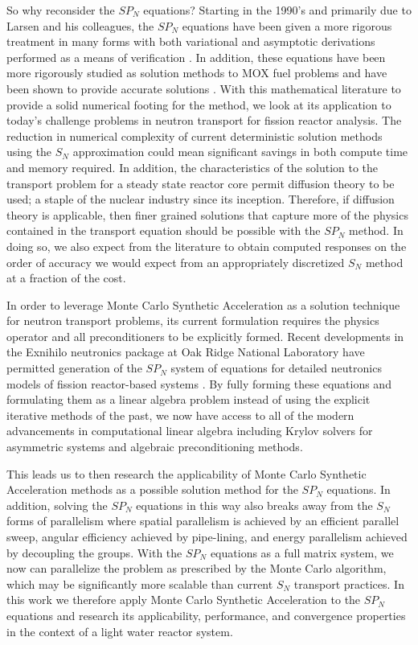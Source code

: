So why reconsider the $SP_N$ equations? Starting in the 1990's and
primarily due to Larsen and his colleagues, the $SP_N$ equations have
been given a more rigorous treatment in many forms with both
variational and asymptotic derivations performed as a means of
verification \cite{olbrant_asymptotic_2013}. In addition, these
equations have been more rigorously studied as solution methods to MOX
fuel problems and have been shown to provide accurate solutions
\cite{brantley_simplified_2000}. With this mathematical literature to
provide a solid numerical footing for the method, we look at its
application to today's challenge problems in neutron transport for
fission reactor analysis. The reduction in numerical complexity of
current deterministic solution methods using the $S_N$ approximation
could mean significant savings in both compute time and memory
required. In addition, the characteristics of the solution to the
transport problem for a steady state reactor core permit diffusion
theory to be used; a staple of the nuclear industry since its
inception. Therefore, if diffusion theory is applicable, then finer
grained solutions that capture more of the physics contained in the
transport equation should be possible with the $SP_N$ method. In doing
so, we also expect from the literature to obtain computed responses on
the order of accuracy we would expect from an appropriately
discretized $S_N$ method at a fraction of the cost.

In order to leverage Monte Carlo Synthetic Acceleration as a solution
technique for neutron transport problems, its current formulation
requires the physics operator and all preconditioners to be explicitly
formed. Recent developments in the Exnihilo neutronics package at Oak
Ridge National Laboratory have permitted generation of the $SP_N$
system of equations for detailed neutronics models of fission
reactor-based systems \cite{evans_simplified_2013}. By fully forming
these equations and formulating them as a linear algebra problem
instead of using the explicit iterative methods of the past, we now
have access to all of the modern advancements in computational linear
algebra including Krylov solvers for asymmetric systems and algebraic
preconditioning methods.

This leads us to then research the applicability of Monte Carlo
Synthetic Acceleration methods as a possible solution method for the
$SP_N$ equations. In addition, solving the $SP_N$ equations in this
way also breaks away from the $S_N$ forms of parallelism where spatial
parallelism is achieved by an efficient parallel sweep, angular
efficiency achieved by pipe-lining, and energy parallelism achieved by
decoupling the groups. With the $SP_N$ equations as a full matrix
system, we now can parallelize the problem as prescribed by the Monte
Carlo algorithm, which may be significantly more scalable than current
$S_N$ transport practices. In this work we therefore apply Monte Carlo
Synthetic Acceleration to the $SP_N$ equations and research its
applicability, performance, and convergence properties in the context
of a light water reactor system.

